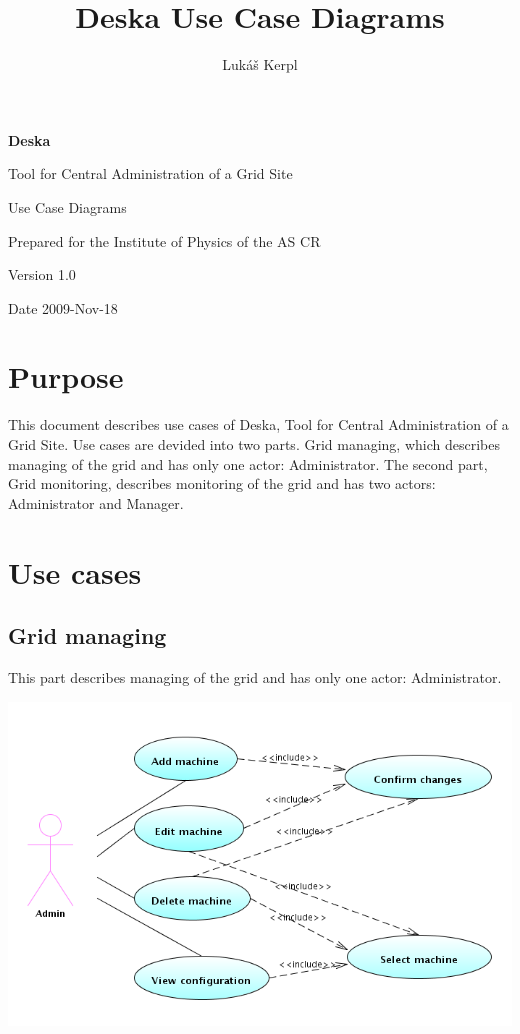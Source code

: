 \documentclass[12pt]{article}
\author{Lukáš Kerpl}
\title{Deska Use Case Diagrams}
\begin{document}
{\Huge \textbf{Deska}}

\vspace{0.2in}

{\large Tool for Central Administration of a Grid Site}

\vspace{0.5in}

{\large Use Case Diagrams}

\vspace{0.2in}

{\large Prepared for the Institute of Physics of the AS CR}

\vspace{0.2in}

{\large Version 1.0}

\vspace{0.2in}

{\large Date 2009-Nov-18}

\vspace{0.5in}

\tableofcontents

\newpage


\section{Purpose}
This document describes use cases of Deska, Tool for Central Administration
of a Grid Site. Use cases are devided into two parts. Grid managing, which
describes managing of the grid and has only one actor: Administrator.
The second part, Grid monitoring, describes monitoring of the grid and has
two actors: Administrator and Manager.

\section{Use cases}

\subsection{Grid managing}
This part describes managing of the grid and has only one actor: Administrator.

\includegraphics[width=\linewidth]{grid_managing.png}
\end{document}

